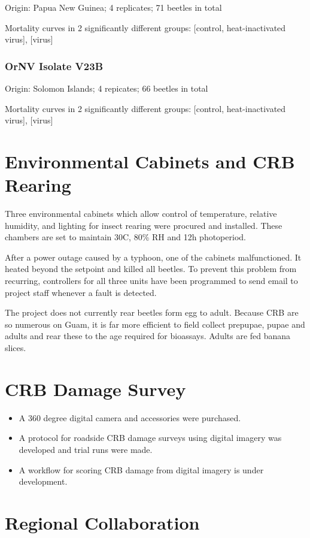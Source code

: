 \documentclass[12pt,letterpaper,english]{scrartcl}
\begin{document}
Origin: Papua New Guinea; 4 replicates; 71 beetles in total

Mortality curves in 2 significantly different groups: {[}control,
heat-inactivated virus{]}, {[}virus{]}

\subsubsection{OrNV Isolate V23B}

Origin: Solomon Islands; 4 repicates; 66 beetles in total

Mortality curves in 2 significantly different groups: {[}control,
heat-inactivated virus{]}, {[}virus{]}

\section{Environmental Cabinets and CRB Rearing}

Three environmental cabinets which allow control of temperature, relative
humidity, and lighting for insect rearing were procured and installed.
These chambers are set to maintain 30\textdegree{}C, 80\% RH and
12h photoperiod.

After a power outage caused by a typhoon, one of the cabinets malfunctioned.
It heated beyond the setpoint and killed all beetles. To prevent this
problem from recurring, controllers for all three units have been
programmed to send email to project staff whenever a fault is detected.

The project does not currently rear beetles form egg to adult. Because
CRB are so numerous on Guam, it is far more efficient to field collect
prepupae, pupae and adults and rear these to the age required for
bioassays. Adults are fed banana slices.

\section{CRB Damage Survey}
\begin{itemize}
\item A 360 degree digital camera and accessories were purchased.
\item A protocol for roadside CRB damage surveys using digital imagery was
developed and trial runs were made.
\item A workflow for scoring CRB damage from digital imagery is under development.
\end{itemize}

\section{Regional Collaboration}
\end{document}
